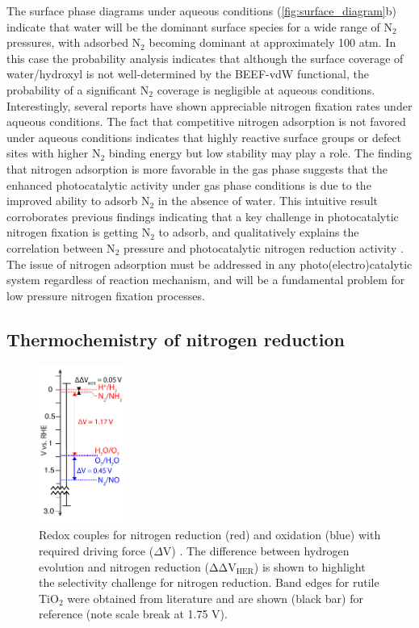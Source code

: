 \documentclass[journal=ascecg,manuscript=article,articletitle=true]{achemso}
\begin{document}
The surface phase diagrams under aqueous conditions (\ref{fig:surface_diagram}b) indicate that water will be the dominant surface species for a wide range of N$_2$ pressures, with adsorbed N$_2$ becoming dominant at approximately 100 atm. In this case the probability analysis indicates that although the surface coverage of water/hydroxyl is not well-determined by the BEEF-vdW functional, the probability of a significant N$_2$ coverage is negligible at aqueous conditions. Interestingly, several reports have shown appreciable nitrogen fixation rates under aqueous conditions. \cite{Augugliaro_1982,Hirakawa_2017} The fact that competitive nitrogen adsorption is not favored under aqueous conditions indicates that highly reactive surface groups or defect sites with higher N$_2$ binding energy but low stability may play a role. The finding that nitrogen adsorption is more favorable in the gas phase suggests that the enhanced photocatalytic activity under gas phase conditions is due to the improved ability to adsorb N$_2$ in the absence of water. This intuitive result corroborates previous findings indicating that a key challenge in photocatalytic nitrogen fixation is getting N$_2$ to adsorb\cite{Zhu_2013,Vettraino_2002,Schrauzer_2011}, and qualitatively explains the  correlation between N$_2$ pressure and photocatalytic nitrogen reduction activity \cite{Schrauzer_2011,Ali_2016}. The issue of nitrogen adsorption must be addressed in any photo(electro)catalytic system regardless of reaction mechanism, and will be a fundamental problem for low pressure nitrogen fixation processes.

\subsection{Thermochemistry of nitrogen reduction}

\begin{figure}[h]
\centering

\includegraphics[width=0.25\textwidth]{figures/N2_redox_ladder.pdf}
\caption{Redox couples for nitrogen reduction (red) and oxidation (blue) with required driving force ($\Delta$V) \cite{Medford_2017}. The difference between hydrogen evolution and nitrogen reduction ($\mathrm{\Delta \Delta V_{HER}}$) is shown to highlight the selectivity challenge for nitrogen reduction. Band edges for rutile TiO$_2$ were obtained from literature \cite{Nozik_1996}  and are shown (black bar) for reference (note scale break at 1.75 V).}
\label{fig:redox_ladder}
\end{figure}
\end{document}
